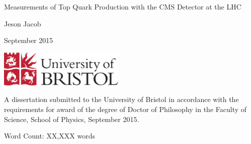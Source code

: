 \begin{titlepage}
	
	\begin{center}
		
		\vspace*{1cm}
		
		\Huge
		
		Measurements of Top Quark Production with the CMS Detector at the LHC

		\vspace{0.5cm}
		
		\large
		
		Jeson Jacob
		
		\vspace{0.5cm}
		
		September 2015 %
		
		\vspace{0.5cm}
		
		\includegraphics[width=60mm]{Images/UnivShield}
		
		\vfill
		
		\normalsize
	\end{center}
	A dissertation submitted to the University of Bristol in accordance with the
	requirements for award of the degree of Doctor of Philosophy in the Faculty of
	Science, School of Physics, September 2015.

	\begin{flushright}
		Word Count: XX,XXX words
	\end{flushright}

\end{titlepage}